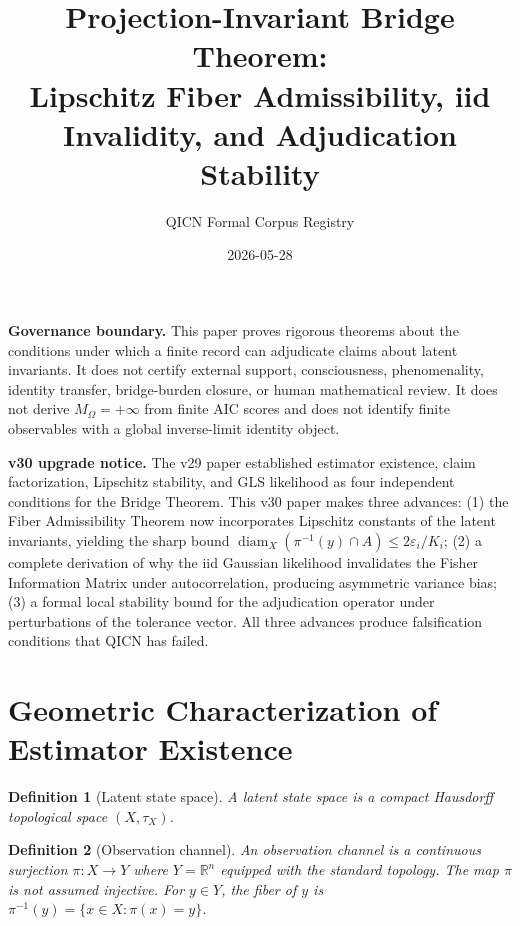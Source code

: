 \documentclass[11pt]{article}
\title{Projection-Invariant Bridge Theorem:\\\large Lipschitz Fiber Admissibility, iid Invalidity, and Adjudication Stability}
\author{QICN Formal Corpus Registry}
\date{2026-05-28}
\newtheorem{definition}{Definition}
\begin{document}
\maketitle

\noindent\textbf{Governance boundary.} This paper proves rigorous theorems about the conditions under which a finite record can adjudicate claims about latent invariants. It does not certify external support, consciousness, phenomenality, identity transfer, bridge-burden closure, or human mathematical review. It does not derive $M_{\Omega}=+\infty$ from finite AIC scores and does not identify finite observables with a global inverse-limit identity object.

\noindent\textbf{v30 upgrade notice.} The v29 paper established estimator existence, claim factorization, Lipschitz stability, and GLS likelihood as four independent conditions for the Bridge Theorem. This v30 paper makes three advances: (1) the Fiber Admissibility Theorem now incorporates Lipschitz constants of the latent invariants, yielding the sharp bound $\operatorname{diam}_X(\pi^{-1}(y)\cap A)\leq 2\varepsilon_i/K_i$; (2) a complete derivation of why the iid Gaussian likelihood invalidates the Fisher Information Matrix under autocorrelation, producing asymmetric variance bias; (3) a formal local stability bound for the adjudication operator under perturbations of the tolerance vector. All three advances produce falsification conditions that QICN has failed.

\tableofcontents
\newpage

\section{Geometric Characterization of Estimator Existence}
\label{sec:estimator-existence}

\begin{definition}[Latent state space]
A \emph{latent state space} is a compact Hausdorff topological space $(X,\tau_X)$.
\end{definition}

\begin{definition}[Observation channel]
An \emph{observation channel} is a continuous surjection $\pi\colon X\to Y$ where $Y=\mathbb{R}^n$ equipped with the standard topology. The map $\pi$ is not assumed injective. For $y\in Y$, the \emph{fiber} of $y$ is $\pi^{-1}(y)=\{x\in X:\pi(x)=y\}$.
\end{definition}
\end{document}
